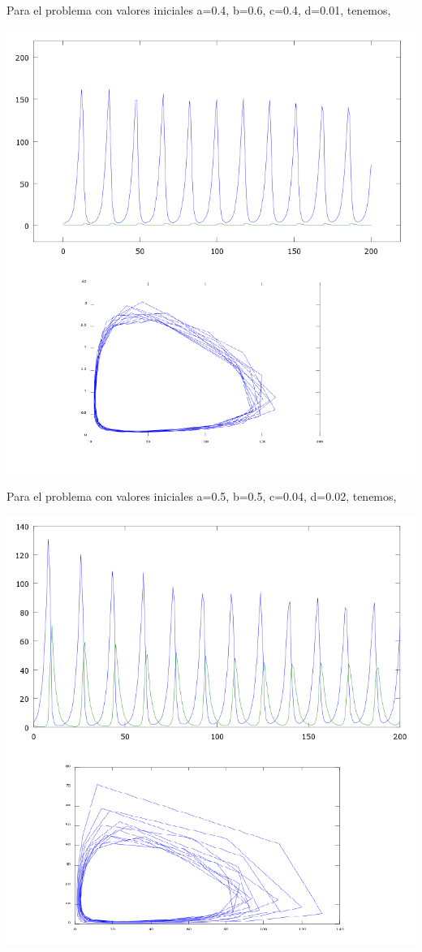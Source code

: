 \documentclass[10pt,letterpaper]{article}
\begin{document}
\pagebreak
Para el problema con valores iniciales a=0.4, b=0.6, c=0.4, d=0.01, tenemos,\\
\begin{center}
	\includegraphics[scale=0.5]{Pic/DPf4}
\end{center}

\pagebreak
Para el problema con valores iniciales a=0.5, b=0.5, c=0.04, d=0.02, tenemos,\\
\begin{center}
	\includegraphics[scale=0.5]{Pic/DPf5}
\end{center}
\end{document}

